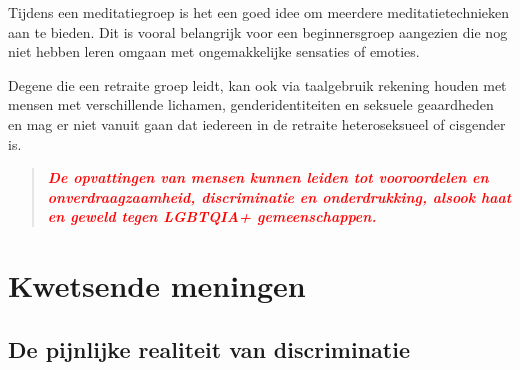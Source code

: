 \documentclass[12pt,openany]{book}
\begin{document}
Tijdens een meditatiegroep is het een goed idee om meerdere meditatietechnieken aan te bieden. Dit is vooral belangrijk voor een beginnersgroep aangezien die nog niet hebben leren omgaan met ongemakkelijke sensaties of emoties. 

Degene die een retraite groep leidt, kan ook via taalgebruik rekening houden met mensen met verschillende lichamen, genderidentiteiten en seksuele geaardheden en mag er niet vanuit gaan dat iedereen in de retraite heteroseksueel of cisgender is.

\newpage
\thispagestyle{empty}

\vfill

\begin{figure}[h]
    \centering
\end{figure}

\begin{quote}
\centering
\doublespacing
\textit{\Large \textcolor{red}{\textbf{De opvattingen van mensen kunnen leiden tot vooroordelen en onverdraagzaamheid, discriminatie en onderdrukking, alsook haat en geweld tegen LGBTQIA+ gemeenschappen.}}}
\end{quote}

\chapter*{Kwetsende meningen}

\section*{De pijnlijke realiteit van discriminatie}
\end{document}
